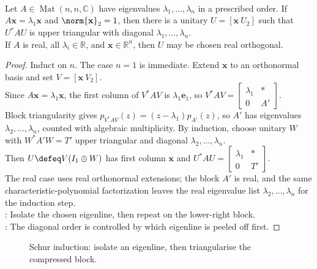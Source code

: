 \begin{theorem} \label{thm:matrix-schur-triangularization-ordered} \\
Let $A\in\operatorname{Mat}(n,n,\mathbb{C})$ have eigenvalues $\lambda_1,\ldots,\lambda_n$ in a prescribed order. If $A\mathbf{x}=\lambda_1\mathbf{x}$ and $\norm{\mathbf{x}}_2=1$, then there is a unitary $U=[\mathbf{x}\ U_2]$ such that $U^*AU$ is upper triangular with diagonal $\lambda_1,\ldots,\lambda_n$.\\
If $A$ is real, all $\lambda_i\in\mathbb{R}$, and $\mathbf{x}\in\mathbb{R}^n$, then $U$ may be chosen real orthogonal.
\begin{proof}
Induct on $n$. The case $n=1$ is immediate. Extend $\mathbf{x}$ to an orthonormal basis and set $V=[\mathbf{x}\ V_2]$.\\
Since $A\mathbf{x}=\lambda_1\mathbf{x}$, the first column of $V^*AV$ is $\lambda_1\mathbf{e}_1$, so $V^*AV=
\begin{bmatrix}
\lambda_1 & *\\
0 & A'
\end{bmatrix}$.\\
Block triangularity gives $p_{V^*AV}(z)=(z-\lambda_1)p_{A'}(z)$, so $A'$ has eigenvalues $\lambda_2,\ldots,\lambda_n$, counted with algebraic multiplicity. By induction, choose unitary $W$ with $W^*A'W=T'$ upper triangular and diagonal $\lambda_2,\ldots,\lambda_n$.\\
Then $U\defeq V(I_1\oplus W)$ has first column $\mathbf{x}$ and $U^*AU=
\begin{bmatrix}
\lambda_1 & *\\
0 & T'
\end{bmatrix}$.\\
The real case uses real orthonormal extensions; the block $A'$ is real, and the same characteristic-polynomial factorization leaves the real eigenvalue list $\lambda_2,\ldots,\lambda_n$ for the induction step.\\
: Isolate the chosen eigenline, then repeat on the lower-right block.\\
: The diagonal order is controlled by which eigenline is peeled off first.
\end{proof}
\end{theorem}

\begin{figure}[H]
  \centering
  
  \caption{Schur induction: isolate an eigenline, then triangularise the compressed block.}
  \label{fig:schur-ordered-triangularization}
\end{figure}

